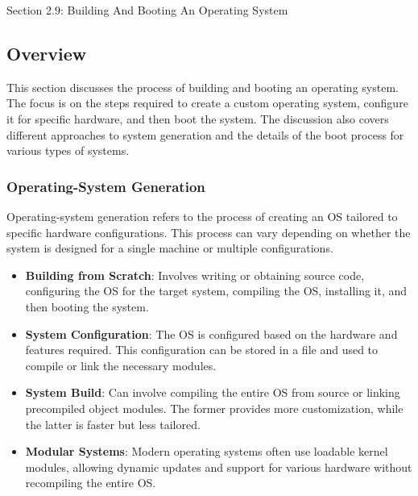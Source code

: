 \begin{notes}{Section 2.9: Building And Booting An Operating System}
    \subsection*{Overview}

    This section discusses the process of building and booting an operating system. The focus is on the steps required to create a custom operating system, configure it for specific hardware, and then 
    boot the system. The discussion also covers different approaches to system generation and the details of the boot process for various types of systems.
    
    \subsubsection*{Operating-System Generation}
    
    Operating-system generation refers to the process of creating an OS tailored to specific hardware configurations. This process can vary depending on whether the system is designed for a single 
    machine or multiple configurations.
    
    \begin{highlight}
    
    \begin{itemize}
        \item \textbf{Building from Scratch}: Involves writing or obtaining source code, configuring the OS for the target system, compiling the OS, installing it, and then booting the system.
        \item \textbf{System Configuration}: The OS is configured based on the hardware and features required. This configuration can be stored in a file and used to compile or link the necessary modules.
        \item \textbf{System Build}: Can involve compiling the entire OS from source or linking precompiled object modules. The former provides more customization, while the latter is faster but less tailored.
        \item \textbf{Modular Systems}: Modern operating systems often use loadable kernel modules, allowing dynamic updates and support for various hardware without recompiling the entire OS.
    \end{itemize}
    
    \end{highlight}
    

\end{notes}

